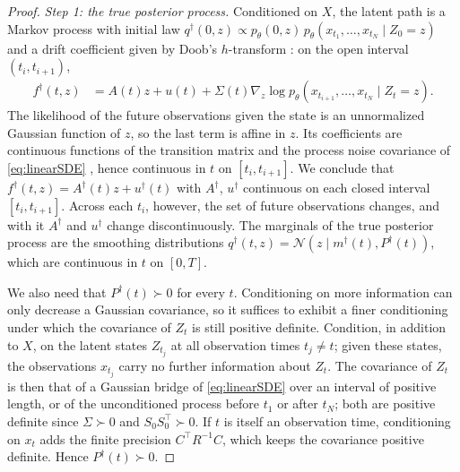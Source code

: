 \documentclass{article} %
\newcommand{\postdrift}{f}
\newcommand{\obs}{X}
\newcommand{\Norm}{\mathcal{N}}
\begin{document}
\begin{proof}

\emph{Step 1: the true posterior process.} Conditioned on $\obs$, the latent path is a Markov process with initial law $q^\dagger(0, z) \propto p_\theta(0, z) \, p_\theta(x_{t_1}, \ldots, x_{t_N} \mid Z_0 = z)$ and a drift coefficient given by Doob's $h$-transform \citep[Appendix B]{bartosh2025sde}: on the open interval $(t_i, t_{i+1})$,
\begin{align*}
    \postdrift^\dagger(t, z) &= A(t) z + u(t) + \Sigma(t) \nabla_z \log p_\theta(x_{t_{i+1}}, \ldots, x_{t_N} \mid Z_t = z).
\end{align*}
The likelihood of the future observations given the state is an unnormalized Gaussian function of $z$, so the last term is affine in $z$. Its coefficients are continuous functions of the transition matrix and the process noise covariance of \cref{eq:linearSDE} \citep{Särkkä_Solin_2019}, hence continuous in $t$ on $[t_i, t_{i+1}]$. We conclude that $\postdrift^\dagger(t, z) = A^\dagger(t) z + u^\dagger(t)$ with $A^\dagger$, $u^\dagger$ continuous on each closed interval $[t_i, t_{i+1}]$. Across each $t_i$, however, the set of future observations changes, and with it $A^\dagger$ and $u^\dagger$ change discontinuously. The marginals of the true posterior process are the smoothing distributions $q^\dagger(t, z) = \Norm(z \mid m^\dagger(t), P^\dagger(t))$, which are continuous in $t$ on $[0, T]$.

We also need that $P^\dagger(t) \succ 0$ for every $t$. Conditioning on more information can only decrease a Gaussian covariance, so it suffices to exhibit a finer conditioning under which the covariance of $Z_t$ is still positive definite. Condition, in addition to $\obs$, on the latent states $Z_{t_j}$ at all observation times $t_j \neq t$; given these states, the observations $x_{t_j}$ carry no further information about $Z_t$. The covariance of $Z_t$ is then that of a Gaussian bridge of \cref{eq:linearSDE} over an interval of positive length, or of the unconditioned process before $t_1$ or after $t_N$; both are positive definite since $\Sigma \succ 0$ and $S_0 S_0^\top \succ 0$. If $t$ is itself an observation time, conditioning on $x_t$ adds the finite precision $C^\top R^{-1} C$, which keeps the covariance positive definite. Hence $P^\dagger(t) \succ 0$.


\end{proof}
\end{document}
